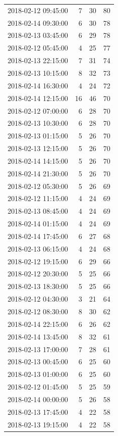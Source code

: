 \begin{tabular}{lrrr}
2018-02-12 09:45:00 & 7 & 30 & 80 \\
2018-02-14 09:30:00 & 6 & 30 & 78 \\
2018-02-13 03:45:00 & 6 & 29 & 78 \\
2018-02-12 05:45:00 & 4 & 25 & 77 \\
2018-02-13 22:15:00 & 7 & 31 & 74 \\
2018-02-13 10:15:00 & 8 & 32 & 73 \\
2018-02-14 16:30:00 & 4 & 24 & 72 \\
2018-02-14 12:15:00 & 16 & 46 & 70 \\
2018-02-12 07:00:00 & 6 & 28 & 70 \\
2018-02-13 10:30:00 & 6 & 28 & 70 \\
2018-02-13 01:15:00 & 5 & 26 & 70 \\
2018-02-13 12:15:00 & 5 & 26 & 70 \\
2018-02-14 14:15:00 & 5 & 26 & 70 \\
2018-02-14 21:30:00 & 5 & 26 & 70 \\
2018-02-12 05:30:00 & 5 & 26 & 69 \\
2018-02-12 11:15:00 & 4 & 24 & 69 \\
2018-02-13 08:45:00 & 4 & 24 & 69 \\
2018-02-14 01:15:00 & 4 & 24 & 69 \\
2018-02-14 17:45:00 & 6 & 27 & 68 \\
2018-02-13 06:15:00 & 4 & 24 & 68 \\
2018-02-12 19:15:00 & 6 & 29 & 66 \\
2018-02-12 20:30:00 & 5 & 25 & 66 \\
2018-02-13 18:30:00 & 5 & 25 & 66 \\
2018-02-12 04:30:00 & 3 & 21 & 64 \\
2018-02-12 08:30:00 & 8 & 30 & 62 \\
2018-02-14 22:15:00 & 6 & 26 & 62 \\
2018-02-14 13:45:00 & 8 & 32 & 61 \\
2018-02-13 17:00:00 & 7 & 28 & 61 \\
2018-02-13 00:45:00 & 6 & 25 & 60 \\
2018-02-13 01:00:00 & 6 & 25 & 60 \\
2018-02-12 01:45:00 & 5 & 25 & 59 \\
2018-02-14 00:00:00 & 5 & 26 & 58 \\
2018-02-13 17:45:00 & 4 & 22 & 58 \\
2018-02-13 19:15:00 & 4 & 22 & 58 \\

\end{tabular}
